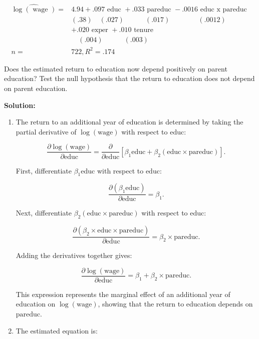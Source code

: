 \documentclass[12pt]{article}
\begin{document}
\begin{enumerate}
\begin{enumerate}
$$
\begin{aligned}
\widehat{\log (\text { wage })}= & 4.94+.097 \text { educ }+.033 \text { pareduc }-.0016 \text { educ x pareduc } \\
& (.38) \quad(.027) \quad \quad \quad(.017)  \quad \quad \quad \quad(.0012)\\
& +.020 \text { exper }+.010 \text { tenure } \\
&  \quad(.004) \quad\quad\quad(.003) \\
n= & 722, R^2=.174
\end{aligned}
$$


Does the estimated return to education now depend positively on parent education? Test the null hypothesis that the return to education does not depend on parent education.
\end{enumerate}

{\color{blue}
\noindent \textbf{Solution:}

\begin{enumerate}

\item The return to an additional year of education is determined by taking the partial derivative of \( \log(\text{wage}) \) with respect to \( \text{educ} \):

\[
\frac{\partial \log(\text{wage})}{\partial \text{educ}} = \frac{\partial}{\partial \text{educ}} \left[ \beta_1 \text{educ} + \beta_2 (\text{educ} \times \text{pareduc}) \right].
\]

First, differentiate \( \beta_1 \text{educ} \) with respect to \( \text{educ} \):

\[
\frac{\partial (\beta_1 \text{educ})}{\partial \text{educ}} = \beta_1.
\]

Next, differentiate \( \beta_2 (\text{educ} \times \text{pareduc}) \) with respect to \( \text{educ} \):

\[
\frac{\partial (\beta_2 \times \text{educ} \times \text{pareduc})}{\partial \text{educ}} = \beta_2 \times \text{pareduc}.
\]

Adding the derivatives together gives:

\[
\frac{\partial \log(\text{wage})}{\partial \text{educ}} = \beta_1 + \beta_2 \times \text{pareduc}.
\]

This expression represents the marginal effect of an additional year of education on \( \log(\text{wage}) \), showing that the return to education depends on \( \text{pareduc} \).

\item The estimated equation is:


\end{enumerate}}
\end{enumerate}
\end{document}
